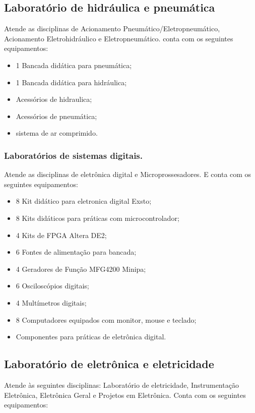 \subsection{Laboratório de hidráulica e pneumática}
Atende as disciplinas de Acionamento Pneumático/Eletropneumático, Acionamento Eletrohidráulico e Eletropneumático. conta com os seguintes equipamentos:

\begin{itemize}
\item 1 Bancada didática para pneumática;
\item 1 Bancada didática para hidráulica;
\item Acessórios de hidraulica;
\item Acessórios de pneumática;
\item sistema de ar comprimido.
\end{itemize}

\subsubsection{Laboratórios de sistemas digitais.}
Atende as disciplinas de eletrônica digital e Microprossesadores. E conta com os seguintes equipamentos:
\begin{itemize}
\item 8 Kit didático para eletronica digital Exsto;
\item 8 Kits didáticos para práticas com microcontrolador;
\item 4 Kits de FPGA Altera DE2;
\item 6 Fontes de alimentação para bancada;
\item 4 Geradores de Função MFG4200 Minipa;
\item 6 Osciloscópios digitais;
\item 4 Multímetros digitais;
\item 8 Computadores equipados com monitor, mouse e teclado;
\item Componentes para práticas de eletrônica digital.
\end{itemize}

\subsection{Laboratório de eletrônica e eletricidade}
Atende às seguintes disciplinas: Laboratório de eletricidade, Instrumentação Eletrônica, Eletrônica Geral e Projetos em Eletrônica. Conta com os seguintes equipamentos:

